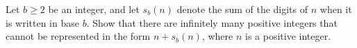 Let $b\geq 2$ be an integer, and let $s_b(n)$ denote the sum of the digits of $n$ when it is written in base $b$.  Show that there are infinitely many positive integers that cannot be represented in the form $n+s_b(n)$, where $n$ is a positive integer.
